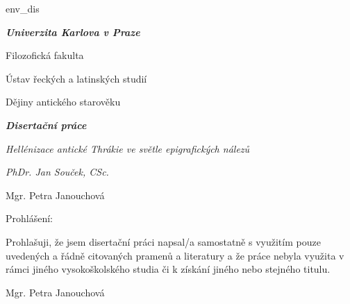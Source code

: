 \environment env_dis

\setuppagenumbering[state=stop,location=]
\setupheadertexts[]
\setupfootertexts[]


\startfrontmatter[page=no]


{\setupalign[middle]\setupwhitespace[big]\setupindenting[no]

{\tfc\bf\em%
Univerzita Karlova v Praze

Filozofická fakulta}

{\tfa%
Ústav řeckých a latinských studií

Dějiny antického starověku}

\vfill

{\tfd\bf\em Disertační práce}

\vfill

{\tfd{}\em Hellénizace antické Thrákie ve světle epigrafických nálezů}

}

\vfill

{\tfb\em%
PhDr. Jan Souček, CSc.

\blank

\currentdate[year] \hfill Mgr. Petra Janouchová}


\vfill

\page

\strut

{\setupindenting[no]
\vfill

{\tf Prohlášení:}

{\tf Prohlašuji, že jsem disertační práci napsal/a samostatně s využitím pouze uvedených a řádně citovaných pramenů a literatury a že práce nebyla využita v rámci jiného vysokoškolského studia či k získání jiného nebo stejného titulu.}


{\hfill\tf Mgr. Petra Janouchová}  
}


\stopfrontmatter
